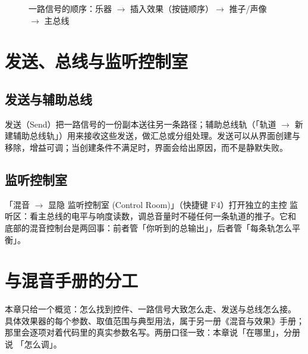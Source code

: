 \begin{figure}[htbp]
\centering
{}
\caption{一路信号的顺序：乐器 $\to$ 插入效果（按链顺序）$\to$ 推子/声像 $\to$ 主总线}
\label{fig:ch07-signal-flow}
\end{figure}

\section{发送、总线与监听控制室}

\subsection{发送与辅助总线}

发送（Send）把一路信号的一份副本送往另一条路径；辅助总线轨（「轨道 $\to$
新建辅助总线轨」）用来接收这些发送，做汇总或分组处理。发送可以从界面创建与
移除，增益可调；当创建条件不满足时，界面会给出原因，而不是静默失败。


\subsection{监听控制室}

「混音 $\to$ 显隐 监听控制室 (Control Room)」（快捷键 F4）打开独立的主控
监听区：看主总线的电平与响度读数，调总音量时不碰任何一条轨道的推子。它和
底部的混音控制台是两回事：前者管「你听到的总输出」，后者管「每条轨怎么平衡」。


\section{与混音手册的分工}

本章只给一个概览：怎么找到控件、一路信号大致怎么走、发送与总线怎么接。
具体效果器的每个参数、取值范围与典型用法，属于另一册《混音与效果》手册；
那里会逐项对着代码里的真实参数名写。两册口径一致：本章说「在哪里」，分册说
「怎么调」。

